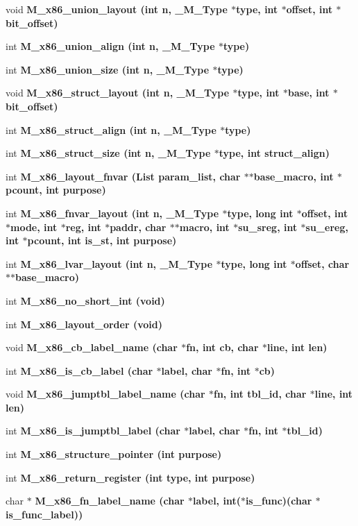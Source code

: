 \begin{CompactItemize}
void \bf{M\_\-x86\_\-union\_\-layout} (int n, \bf{\_\-M\_\-Type} $\ast$type, int $\ast$offset, int $\ast$bit\_\-offset)
\item 
int \bf{M\_\-x86\_\-union\_\-align} (int n, \bf{\_\-M\_\-Type} $\ast$type)
\item 
int \bf{M\_\-x86\_\-union\_\-size} (int n, \bf{\_\-M\_\-Type} $\ast$type)
\item 
void \bf{M\_\-x86\_\-struct\_\-layout} (int n, \bf{\_\-M\_\-Type} $\ast$type, int $\ast$base, int $\ast$bit\_\-offset)
\item 
int \bf{M\_\-x86\_\-struct\_\-align} (int n, \bf{\_\-M\_\-Type} $\ast$type)
\item 
int \bf{M\_\-x86\_\-struct\_\-size} (int n, \bf{\_\-M\_\-Type} $\ast$type, int struct\_\-align)
\item 
int \bf{M\_\-x86\_\-layout\_\-fnvar} (\bf{List} param\_\-list, char $\ast$$\ast$base\_\-macro, int $\ast$pcount, int purpose)
\item 
int \bf{M\_\-x86\_\-fnvar\_\-layout} (int n, \bf{\_\-M\_\-Type} $\ast$type, long int $\ast$offset, int $\ast$\bf{mode}, int $\ast$reg, int $\ast$paddr, char $\ast$$\ast$macro, int $\ast$su\_\-sreg, int $\ast$su\_\-ereg, int $\ast$pcount, int is\_\-st, int purpose)
\item 
int \bf{M\_\-x86\_\-lvar\_\-layout} (int n, \bf{\_\-M\_\-Type} $\ast$type, long int $\ast$offset, char $\ast$$\ast$base\_\-macro)
\item 
int \bf{M\_\-x86\_\-no\_\-short\_\-int} (void)
\item 
int \bf{M\_\-x86\_\-layout\_\-order} (void)
\item 
void \bf{M\_\-x86\_\-cb\_\-label\_\-name} (char $\ast$fn, int cb, char $\ast$line, int len)
\item 
int \bf{M\_\-x86\_\-is\_\-cb\_\-label} (char $\ast$label, char $\ast$fn, int $\ast$cb)
\item 
void \bf{M\_\-x86\_\-jumptbl\_\-label\_\-name} (char $\ast$fn, int tbl\_\-id, char $\ast$line, int len)
\item 
int \bf{M\_\-x86\_\-is\_\-jumptbl\_\-label} (char $\ast$label, char $\ast$fn, int $\ast$tbl\_\-id)
\item 
int \bf{M\_\-x86\_\-structure\_\-pointer} (int purpose)
\item 
int \bf{M\_\-x86\_\-return\_\-register} (int type, int purpose)
\item 
char $\ast$ \bf{M\_\-x86\_\-fn\_\-label\_\-name} (char $\ast$label, int($\ast$is\_\-func)(char $\ast$is\_\-func\_\-label))
\item 
$$
\end{CompactItemize}
